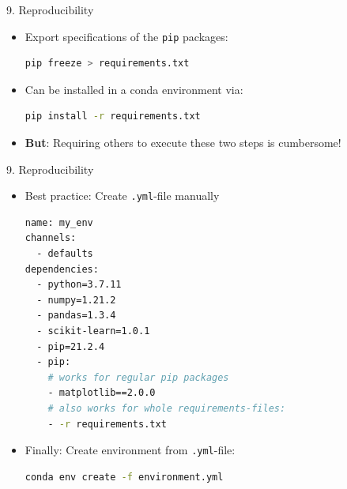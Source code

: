 
\begin{vbframe}{9. Reproducibility}

\vfill

\begin{itemize}
	\item Export specifications of the \texttt{pip} packages:
		\begin{lstlisting}[language=bash]
pip freeze > requirements.txt
		\end{lstlisting}
	\item Can be installed in a conda environment via:
		\begin{lstlisting}[language=bash]
pip install -r requirements.txt
		\end{lstlisting}
	\item \textbf{But}: Requiring others to execute these two steps is cumbersome!
\end{itemize}

\vfill

\end{vbframe}


\begin{vbframe}{9. Reproducibility}

\vfill

\begin{itemize}
	\item Best practice: Create \texttt{.yml}-file manually
		\begin{lstlisting}[language=bash]
name: my_env
channels:
  - defaults
dependencies:
  - python=3.7.11
  - numpy=1.21.2
  - pandas=1.3.4
  - scikit-learn=1.0.1
  - pip=21.2.4
  - pip:
    # works for regular pip packages
    - matplotlib==2.0.0
    # also works for whole requirements-files:
    - -r requirements.txt
		\end{lstlisting}
	\item Finally: Create environment from \texttt{.yml}-file: 
		\begin{lstlisting}[language=bash]
conda env create -f environment.yml
		\end{lstlisting}
\end{itemize}

\vfill

\end{vbframe}

\endlecture

